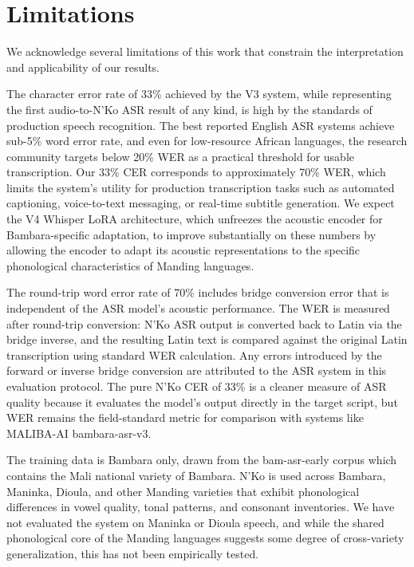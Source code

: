 \documentclass[11pt]{article}
\newcommand{\nko}{N'Ko}
\begin{document}
\section{Limitations}
\label{sec:limitations}

We acknowledge several limitations of this work that constrain the interpretation and applicability of our results.

The character error rate of 33\% achieved by the V3 system, while representing the first audio-to-\nko{} ASR result of any kind, is high by the standards of production speech recognition. The best reported English ASR systems achieve sub-5\% word error rate, and even for low-resource African languages, the research community targets below 20\% WER as a practical threshold for usable transcription. Our 33\% CER corresponds to approximately 70\% WER, which limits the system's utility for production transcription tasks such as automated captioning, voice-to-text messaging, or real-time subtitle generation. We expect the V4 Whisper LoRA architecture, which unfreezes the acoustic encoder for Bambara-specific adaptation, to improve substantially on these numbers by allowing the encoder to adapt its acoustic representations to the specific phonological characteristics of Manding languages.

The round-trip word error rate of 70\% includes bridge conversion error that is independent of the ASR model's acoustic performance. The WER is measured after round-trip conversion: \nko{} ASR output is converted back to Latin via the bridge inverse, and the resulting Latin text is compared against the original Latin transcription using standard WER calculation. Any errors introduced by the forward or inverse bridge conversion are attributed to the ASR system in this evaluation protocol. The pure \nko{} CER of 33\% is a cleaner measure of ASR quality because it evaluates the model's output directly in the target script, but WER remains the field-standard metric for comparison with systems like MALIBA-AI bambara-asr-v3.

The training data is Bambara only, drawn from the bam-asr-early corpus which contains the Mali national variety of Bambara. \nko{} is used across Bambara, Maninka, Dioula, and other Manding varieties that exhibit phonological differences in vowel quality, tonal patterns, and consonant inventories. We have not evaluated the system on Maninka or Dioula speech, and while the shared phonological core of the Manding languages suggests some degree of cross-variety generalization, this has not been empirically tested.
\end{document}
